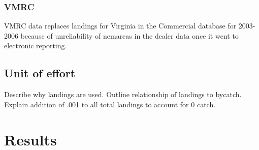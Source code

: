 \documentclass{article}
\begin{document}
\subsubsection{VMRC}
VMRC data replaces landings for Virginia in the Commercial database for 2003-2006 because of unreliability of nemareas in the dealer data once it went to electronic reporting.

\subsection{Unit of effort}
Describe why landings are used. Outline relationship of landings to bycatch. Explain addition of .001 to all total landings to account for 0 catch.

\section{Results}
\end{document}
